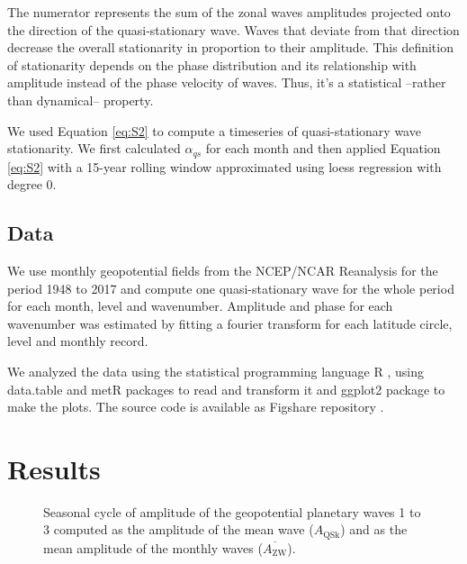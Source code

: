 \documentclass[draft,linenumbers]{agujournal2018}
\begin{document}
The numerator represents the sum of the zonal waves amplitudes projected
onto the direction of the quasi-stationary wave. Waves that deviate from
that direction decrease the overall stationarity in proportion to their
amplitude. This definition of stationarity depends on the phase
distribution and its relationship with amplitude instead of the phase
velocity of waves. Thus, it's a statistical --rather than dynamical--
property.

We used Equation \ref{eq:S2} to compute a timeseries of quasi-stationary
wave stationarity. We first calculated \(\alpha_{qs}\) for each month
and then applied Equation \ref{eq:S2} with a 15-year rolling window
approximated using loess regression with degree 0.

\subsection{Data}

We use monthly geopotential fields from the NCEP/NCAR Reanalysis
\citep{Kalnay1996} for the period 1948 to 2017 and compute one
quasi-stationary wave for the whole period for each month, level and
wavenumber. Amplitude and phase for each wavenumber was estimated by
fitting a fourier transform for each latitude circle, level and monthly
record.

We analyzed the data using the statistical programming language R
\citep{R-base}, using data.table and metR packages
\citep{R-data.table, R-metR} to read and transform it and ggplot2
package \citep{R-ggplot2} to make the plots. The source code is
available as Figshare repository \citep{Campitelli2019-figshare}.

\section{Results}

\begin{figure}[h]

{\centering {}\newline{}

}

\caption{Seasonal cycle of amplitude of the geopotential planetary waves 1 to 3 computed as the amplitude of the mean wave ($A_\mathrm{QSk}$) and as the mean amplitude of the monthly waves ($\overline{A_\mathrm{ZW} }$).}\label{fig:rao}
\end{figure}
\end{document}
